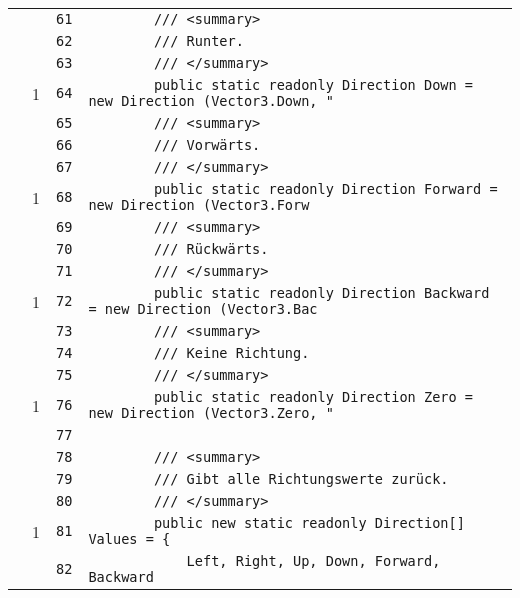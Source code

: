 \documentclass[a4paper,10pt]{article}
\begin{document}
\begin{longtable}[l]{lrrl}
\cellcolor{gray} &  & \verb~61~ & \verb~        /// <summary>~\\
\cellcolor{gray} &  & \verb~62~ & \verb~        /// Runter.~\\
\cellcolor{gray} &  & \verb~63~ & \verb~        /// </summary>~\\
\cellcolor{green} & 1 & \verb~64~ & \verb~        public static readonly Direction Down = new Direction (Vector3.Down, "~\\
\cellcolor{gray} &  & \verb~65~ & \verb~        /// <summary>~\\
\cellcolor{gray} &  & \verb~66~ & \verb~        /// Vorwärts.~\\
\cellcolor{gray} &  & \verb~67~ & \verb~        /// </summary>~\\
\cellcolor{green} & 1 & \verb~68~ & \verb~        public static readonly Direction Forward = new Direction (Vector3.Forw~\\
\cellcolor{gray} &  & \verb~69~ & \verb~        /// <summary>~\\
\cellcolor{gray} &  & \verb~70~ & \verb~        /// Rückwärts.~\\
\cellcolor{gray} &  & \verb~71~ & \verb~        /// </summary>~\\
\cellcolor{green} & 1 & \verb~72~ & \verb~        public static readonly Direction Backward = new Direction (Vector3.Bac~\\
\cellcolor{gray} &  & \verb~73~ & \verb~        /// <summary>~\\
\cellcolor{gray} &  & \verb~74~ & \verb~        /// Keine Richtung.~\\
\cellcolor{gray} &  & \verb~75~ & \verb~        /// </summary>~\\
\cellcolor{green} & 1 & \verb~76~ & \verb~        public static readonly Direction Zero = new Direction (Vector3.Zero, "~\\
\cellcolor{gray} &  & \verb~77~ & \verb~~\\
\cellcolor{gray} &  & \verb~78~ & \verb~        /// <summary>~\\
\cellcolor{gray} &  & \verb~79~ & \verb~        /// Gibt alle Richtungswerte zurück.~\\
\cellcolor{gray} &  & \verb~80~ & \verb~        /// </summary>~\\
\cellcolor{green} & 1 & \verb~81~ & \verb~        public new static readonly Direction[] Values = {~\\
\cellcolor{gray} &  & \verb~82~ & \verb~            Left, Right, Up, Down, Forward,  Backward~\\

\end{longtable}
\end{document}
